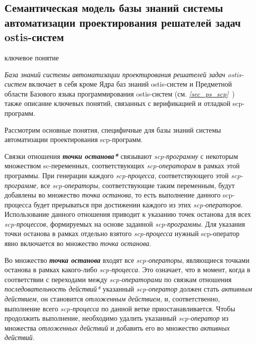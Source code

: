 \subsection{Семантическая модель базы знаний системы автоматизации проектирования решателей задач ostis-систем}
\begin{SCn}
\bigskip

\begin{scnrelfromlist}{ключевое понятие}
\end{scnrelfromlist}
\end{SCn}
\label{sub_sec_kb_ps_des_auto_sys}
\textit{База знаний системы автоматизации проектирования решателей задач ostis-систем} включает в себя кроме Ядра баз знаний ostis-систем и Предметной области Базового языка программирования ostis-систем (см. \textit{\ref{sec_ps_scp}~}) также описание ключевых понятий, связанных с верификацией и отладкой scp-программ.

Рассмотрим основные понятия, специфичные для базы знаний системы автоматизации проектирования scp-программ.

Связки отношения \textbf{\textit{точки останова*}} связывают \textit{scp-программу} с некоторым множеством sc-переменных, соответствующих \textit{scp-операторам} в рамках этой программы. При генерации каждого \textit{scp-процесса}, соответствующего этой \textit{scp-программе}, все \textit{scp-операторы}, соответствующие таким переменным, будут добавлены во множество \textit{точка останова}, то есть выполнение данного scp-процесса будет прерываться при достижении каждого из этих \textit{scp-операторов}.
Использование данного отношения приводит к указанию точек останова для всех \textit{scp-процессов}, формируемых на основе заданной \textit{\mbox{scp-программы}}. Для указания точки останова в рамках отдельно взятого \textit{scp-процесса} нужный scp-оператор явно включается во множество \textit{точка останова}.

\begin{SCn}
\end{SCn}

Во множество \textbf{\textit{точка останова}} входят все \textit{scp-операторы}, являющиеся точками останова в рамках какого-либо \textit{scp-процесса}. Это означает, что в момент, когда в соответствии с переходами между \textit{scp-операторами} по связкам отношения \textit{последовательность действий*} указанный \textit{scp-оператор} должен стать \textit{активным действием}, он становится \textit{отложенным действием}, и, соответственно, выполнение всего \textit{scp-процесса} по данной ветке приостанавливается. Чтобы продолжить выполнение, необходимо удалить указанный \textit{\mbox{scp-оператор}} из множества \textit{отложенных действий} и добавить его во множество \textit{активных действий}.

